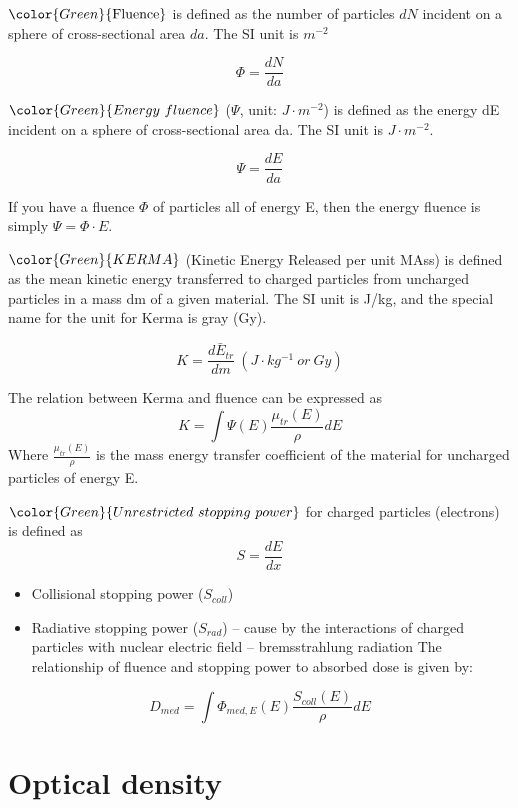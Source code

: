 \documentclass[]{book}
\providecommand{\tightlist}{%
  \setlength{\itemsep}{0pt}\setlength{\parskip}{0pt}}
\theoremstyle{definition}
\theoremstyle{definition}
\theoremstyle{definition}
\theoremstyle{remark}
\begin{document}
\(\color{Green}{\text{Fluence}}\) is defined as the number of particles
\(dN\) incident on a sphere of cross-sectional area \(da\). The SI unit
is \(m^{-2}\)

\begin{equation}
    \Phi = \frac{dN}{da}
    \label{eq:fluence}
\end{equation}

\(\color{Green}{Energy\ fluence}\) (\(\Psi\), unit: \(J\cdot m^{-2}\))
is defined as the energy dE incident on a sphere of cross-sectional area
da. The SI unit is \(J\cdot m^{-2}\).

\begin{equation}
    \Psi = \frac{dE}{da}
    \label{eq:efluence}
\end{equation}

If you have a fluence \(\Phi\) of particles all of energy E, then the
energy fluence is simply \(\Psi = \Phi\cdot E\).

\(\color{Green}{KERMA}\) (Kinetic Energy Released per unit MAss) is
defined as the mean kinetic energy transferred to charged particles from
uncharged particles in a mass dm of a given material. The SI unit is
J/kg, and the special name for the unit for Kerma is gray (Gy).

\begin{equation}
    K=\frac{d\bar E_{tr}}{dm} ~ (J\cdot kg^{-1}\ or\ Gy)
    \label{eq:kerma}
\end{equation}

The relation between Kerma and fluence can be expressed as
\[K=\int \Psi(E)\frac{\mu_{tr}(E)}{\rho}dE\] Where
\(\frac{\mu_{tr}(E)}{\rho}\) is the mass energy transfer coefficient of
the material for uncharged particles of energy E.

\(\color{Green}{Unrestricted\ stopping\ power}\) for charged particles
(electrons) is defined as \[ S = \frac{dE}{dx} \]

\begin{itemize}
\tightlist
\item
  Collisional stopping power (\(S_{coll}\))
\item
  Radiative stopping power (\(S_{rad}\)) -- cause by the interactions of
  charged particles with nuclear electric field -- bremsstrahlung
  radiation The relationship of fluence and stopping power to absorbed
  dose is given by:
\end{itemize}

\[D_{med}=\int \Phi_{med, E}(E)\frac{S_{coll}(E)}{\rho}dE\]

\section{Optical density}\label{optical-density}
\end{document}
